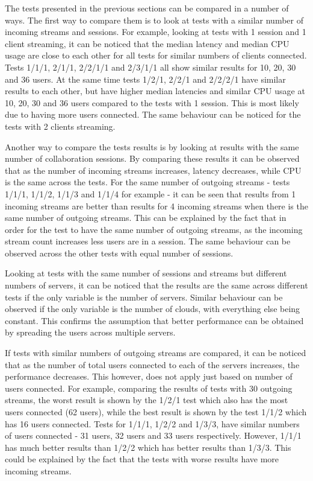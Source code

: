 The tests presented in the previous sections can be compared in a number of ways. The first way to compare them is to look at tests with a similar number of incoming streams and sessions. For example, looking at tests with 1 session and 1 client streaming, it can be noticed that the median latency and median CPU usage are close to each other for all tests for similar numbers of clients connected. Tests 1/1/1, 2/1/1, 2/2/1/1 and 2/3/1/1 all show similar results for 10, 20, 30 and 36 users. At the same time tests 1/2/1, 2/2/1 and 2/2/2/1 have similar results to each other, but have higher median latencies and similar CPU usage at 10, 20, 30 and 36 users compared to the tests with 1 session. This is most likely due to having more users connected. The same behaviour can be noticed for the tests with 2 clients streaming.

Another way to compare the tests results is by looking at results with the same number of collaboration sessions. By comparing these results it can be observed that as the number of incoming streams increases, latency decreases, while CPU is the same across the tests. For the same number of outgoing streams - tests 1/1/1, 1/1/2, 1/1/3 and 1/1/4 for example - it can be seen that results from 1 incoming streams are better than results for 4 incoming streams when there is the same number of outgoing streams. This can be explained by the fact that in order for the test to have the same number of outgoing streams, as the incoming stream count increases less users are in a session. The same behaviour can be observed across the other tests with equal number of sessions.

Looking at tests with the same number of sessions and streams but different numbers of servers, it can be noticed that the results are the same across different tests if the only variable is the number of servers. Similar behaviour can be observed if the only variable is the number of clouds, with everything else being constant. This confirms the assumption that better performance can be obtained by spreading the users across multiple servers.

If tests with similar numbers of outgoing streams are compared, it can be noticed that as the number of total users connected to each of the servers increases, the performance decreases. This however, does not apply just based on number of users connected. For example, comparing the results of tests with 30 outgoing streams, the worst result is shown by the 1/2/1 test which also has the most users connected (62 users), while the best result is shown by the test 1/1/2 which has 16 users connected. Tests for 1/1/1, 1/2/2 and 1/3/3, have similar numbers of users connected - 31 users, 32 users and 33 users respectively. However, 1/1/1 has much better results than 1/2/2 which has better results than 1/3/3. This could be explained by the fact that the tests with worse results have more incoming streams.

